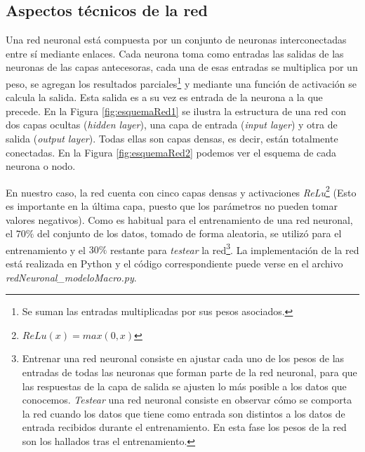 \begin{itemize}
	\subsection{Aspectos técnicos de la red}
	
	Una red neuronal está compuesta por un conjunto de neuronas interconectadas entre sí mediante enlaces. Cada neurona toma como entradas las salidas de las neuronas de las capas antecesoras, cada una de esas entradas se multiplica por un peso, se agregan los resultados parciales\footnote{Se suman las entradas multiplicadas por sus pesos asociados.} y mediante una función de activación se calcula la salida. Esta salida es a su vez es entrada de la neurona a la que precede. En la Figura \ref{fig:esquemaRed1} se ilustra la estructura de una red con dos capas ocultas (\textit{hidden layer}), una capa de entrada (\textit{input layer}) y otra de salida (\textit{output layer}). Todas ellas son capas densas, es decir, están totalmente conectadas. En la Figura \ref{fig:esquemaRed2} podemos ver el esquema de cada neurona o nodo.
	
	En nuestro caso, la red cuenta con cinco capas densas y activaciones \textit{ReLu}\footnote{$ReLu(x) = max(0,x)$} (Esto es importante en la última capa, puesto que los parámetros no pueden tomar valores negativos). Como es habitual para el entrenamiento de una red neuronal, el $70\%$ del conjunto de los datos, tomado de forma aleatoria, se utilizó para el entrenamiento y el $30\%$ restante para \textit{testear} la red\footnote{Entrenar una red neuronal consiste en ajustar cada uno de los pesos de las entradas de todas las neuronas que forman parte de la red neuronal, para que las respuestas de la capa de salida se ajusten lo más posible a los datos que conocemos. \textit{Testear} una red neuronal consiste en observar cómo se comporta la red cuando los datos que tiene como entrada son distintos a los datos de entrada recibidos durante el entrenamiento. En esta fase los pesos de la red son los hallados tras el entrenamiento.}. La implementación de la red está realizada en Python y el código correspondiente puede verse en el archivo \textit{redNeuronal\_modeloMacro.py}. 
	

	
	



\end{itemize}

